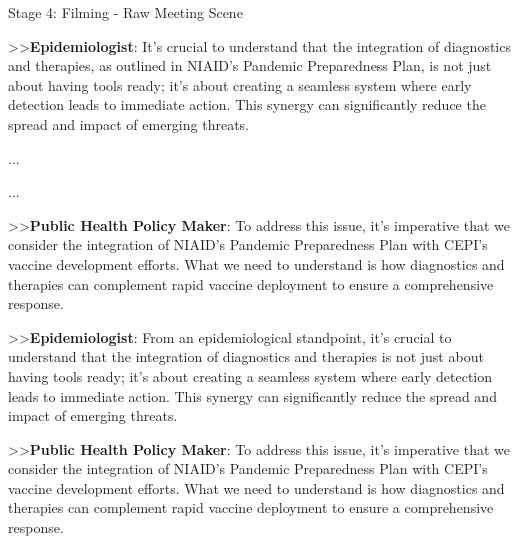 \begin{figure*}[t]
\begin{AIbox}{Stage 4: Filming - Raw Meeting Scene}
{    >>\textbf{Epidemiologist}: It's crucial to understand that the integration of diagnostics and therapies, as outlined in NIAID's Pandemic Preparedness Plan, is not just about having tools ready; it's about creating a seamless system where early detection leads to immediate action. This synergy can significantly reduce the spread and impact of emerging threats.
    

    ...
  


    ...
    
    >>\textbf{Public Health Policy Maker}: To address this issue, it's imperative that we consider the integration of NIAID's Pandemic Preparedness Plan with CEPI's vaccine development efforts. What we need to understand is how diagnostics and therapies can complement rapid vaccine deployment to ensure a comprehensive response.
    
    >>\textbf{Epidemiologist}: From an epidemiological standpoint, it's crucial to understand that the integration of diagnostics and therapies is not just about having tools ready; it's about creating a seamless system where early detection leads to immediate action. This synergy can significantly reduce the spread and impact of emerging threats.
    
    >>\textbf{Public Health Policy Maker}: To address this issue, it's imperative that we consider the integration of NIAID's Pandemic Preparedness Plan with CEPI's vaccine development efforts. What we need to understand is how diagnostics and therapies can complement rapid vaccine deployment to ensure a comprehensive response.

    }
    \end{AIbox}
    \caption{Stage 4: Raw meeting scene, focusing on the discussion around vaccine development and diagnostics integration.}
    \label{fig:stage4_filming}
\end{figure*}




